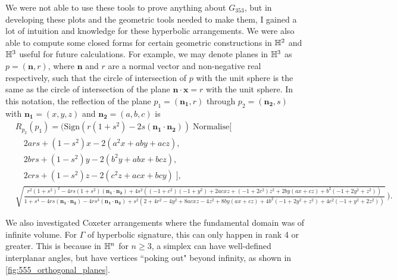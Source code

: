 We were not able to use these tools to prove anything about $G_{353}$, but in developing these plots and the geometric tools needed to make them, I gained a lot of intuition and knowledge for these hyperbolic arrangements.
We were also able to compute some closed forms for certain geometric constructions in $\mathbb{H}^2$ and  $\mathbb{H}^3$ useful for future calculations.
For example, we may denote planes in $\mathbb{H}^3$ as $p = (\mathbf{n},r)$, where $\mathbf{n}$ and $r$ are a normal vector and non-negative real respectively, such that the circle of intersection of $p$ with the unit sphere is the same as the circle of intersection of the plane $\mathbf{n} \cdot \mathbf{x} = r$ with the unit sphere.
In this notation, the reflection of the plane $p_1 =(\mathbf{n_1},r)$ through $p_2 = (\mathbf{n_2},s)$ with $\mathbf{n_1}=(x,y,z)$ and  $\mathbf{n_2}=(a,b,c)$ is
\begin{align*}
	 & {\scriptscriptstyle R_{p_2}(p_1) =\bigg(\text{Sign}\left(r(1+s^2)-2s(\mathbf{n_1}\cdot\mathbf{n_2})\right)\; \text{Normalise}\big[}                      \\
	 & {\scriptscriptstyle\quad 2ars + (1-s^2)x-2(a^2x+aby+acz),                                                                                             }  \\
	 & {\scriptscriptstyle\quad 2brs + (1-s^2)y-2(b^2y+abx+bcz),                                                                                             }  \\
	 & {\scriptscriptstyle\quad 2crs + (1-s^2)z-2(c^2z+acx+bcy) \;\big],                                                                                      } \\
	 & {\scriptscriptstyle\sqrt{\frac{r^2 (1 + s^2)^2 - 4 r s (1 + s^2) (\mathbf{n_1}\cdot\mathbf{n_2}) +
					4 s^2 ((-1 + c^2) (-1 + y^2) + 2 a c x z + (-1 + 2 c^2) z^2 +
					2 b y (a x + c z) + b^2 (-1 + 2 y^2 + z^2))}{1 + s^4 -
					4 r s (\mathbf{n_1}\cdot\mathbf{n_2}) - 4 r s^3 (\mathbf{n_1}\cdot\mathbf{n_2}) +
					s^2 (2 + 4 r^2 - 4 y^2 + 8 a c x z - 4 z^2 + 8 b y (a x + c z) +
					4 b^2 (-1 + 2 y^2 + z^2) + 4 c^2 (-1 + y^2 + 2 z^2))}}\,\bigg)}.
\end{align*}

We also investigated Coxeter arrangements where the fundamental domain was of infinite volume.
For $\Gamma$ of hyperbolic signature, this can only happen in rank 4 or greater.
This is because in  $\mathbb{H}^n$ for  $n\geq 3$, a simplex can have well-defined interplanar angles, but have vertices ``poking out" beyond infinity, as shown in \cref{fig:555_orthogonal_planes}.

